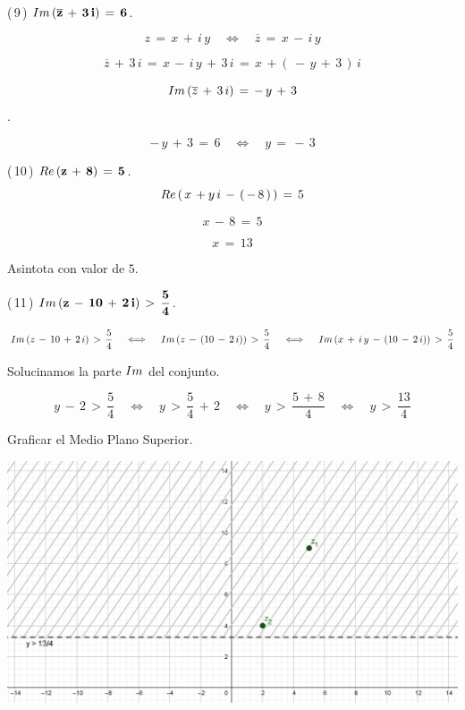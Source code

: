 \documentclass[a4paper,11pt,openany]{book}
\begin{document}
\textcolor{ao(english)}{(\,9\,)} $\bf{\mathnormal{Im}\,(\overline{z}\,+\,3\,i)\,=\,6}$.

$$z\,=\,x\,+\,i\,y \quad\iff\quad \overline{z}\,=\,x\,-\,i\,y $$

$$\overline{z}\,+\,3\,i\,=\,x\,-\,i\,y\,+\,3\,i\,=\,x\,+(\,-\,y\,+\,3\,)\,i$$

$$\mathnormal{Im}\,(\overline{z}\,+\,3\,i)\,=\,-\,y\,+\,3$$.

$$-\,y\,+\,3\,=\,6 \quad\iff\quad y\,=\,-\,3$$

\begin{center}
\end{center}

\textcolor{ao(english)}{(\,10\,)} $\bf{\mathnormal{Re}\,(z\,+\,8)\,=\,5}$.\\

$$\mathnormal{Re}\,(\,x\,+y\,i\,-\,(\,-\,8\,)\,)\,=\,5$$

$$x\,-\,8\,=\,5$$

$$x\,=\,13$$

Asintota con valor de $5$.\\

\begin{center}
\end{center}

\textcolor{ao(english)}{(\,11\,)} $\bf{\mathnormal{Im}\,(z\,-\,10\,+\,2\,i)\,>\,\dfrac{5}{4}}$.

$$\mathnormal{Im}\,(z\,-\,10\,+\,2\,i)\,>\,\dfrac{5}{4} \quad\iff\quad \mathnormal{Im}\,(z\,-\,(10\,-\,2\,i))\,>\,\dfrac{5}{4} \quad\iff\quad \mathnormal{Im}\,(x\,+\,i\,y\,-\,(10\,-\,2\,i))\,>\,\dfrac{5}{4}$$

\textcolor{ao(english)}{} Solucinamos la parte $\mathnormal{Im}$ del conjunto.

$$y\,-\,2\,>\,\dfrac{5}{4} \quad\iff\quad y\,>\,\dfrac{5}{4}\,+\,2 \quad\iff\quad y\,>\,\dfrac{5\,+\,8}{4} \quad\iff\quad y\,>\,\dfrac{13}{4}$$

\textcolor{ao(english)}{} Graficar el Medio Plano Superior.

\begin{center}
    \includegraphics[width=15cm]{Gra-Ej-11.png}
\end{center}
\end{document}
